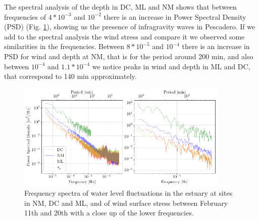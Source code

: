 \documentclass[tesis.tex]{subfiles}
\begin{document}
    The spectral analysis of the depth in DC, ML and NM shows that between frequencies of $4*10^{-3}$ and $10^{-2}$ there is an increase in Power Spectral Density (PSD) (Fig. \ref{fig:freq}), showing us the presence of infragravity waves in Pescadero. If we add to the spectral analysis the wind stress and compare it we observed some similarities in the frequencies. Between $8*10^{-5}$ and $10^{-4}$ there is an increase in PSD for wind and depth at NM, that is for the period around 200 min, and also between $10^{-4}$ and $1.1*10^{-4}$ we notice peaks in wind and depth in ML and DC, that correspond to 140 min approximately.
    
    \begin{figure}[h!]
      \centering
      \includegraphics[width=0.9\textwidth]{Imagenes/freqs.png}
      \caption{Frequency spectra of water level fluctuations in the estuary at sites in NM, DC and ML, and of wind surface stress between February 11th and 20th with a close up of the lower frequencies.}
      \label{fig:freq}
    \end{figure}
\end{document}
